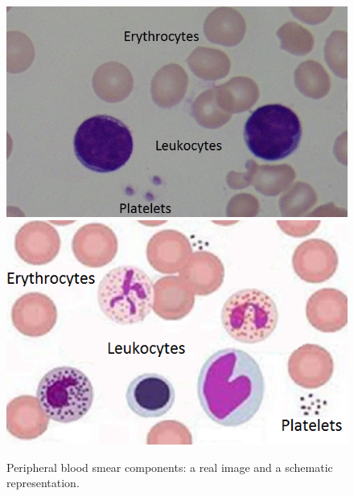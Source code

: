 \documentclass[final,a4paper,12pt,english]{UnicaPhdThesis3}
\begin{document}
\begin{figure}[!htbp]
\centering
\includegraphics[height=0.21\textheight]{images/Cells1}
\includegraphics[height=0.21\textheight]{images/Cells2}
\caption{\label{fig:leukocytes} Peripheral blood smear components: a real image and a schematic representation.}
\end{figure}
\end{document}
